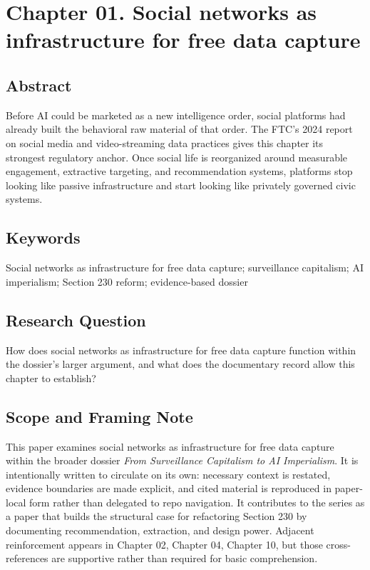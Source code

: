\documentclass[
  american,
  11pt,
  letterpaper,
]{article}
\begin{document}
\newpage

\section{Chapter 01. Social networks as infrastructure for free data
capture}\label{chapter-01.-social-networks-as-infrastructure-for-free-data-capture}

\subsection{Abstract}\label{abstract-1}

Before AI could be marketed as a new intelligence order, social
platforms had already built the behavioral raw material of that order.
The FTC's 2024 report on social media and video-streaming data practices
gives this chapter its strongest regulatory anchor. Once social life is
reorganized around measurable engagement, extractive targeting, and
recommendation systems, platforms stop looking like passive
infrastructure and start looking like privately governed civic systems.

\subsection{Keywords}\label{keywords-1}

Social networks as infrastructure for free data capture; surveillance
capitalism; AI imperialism; Section 230 reform; evidence-based dossier

\subsection{Research Question}\label{research-question-1}

How does social networks as infrastructure for free data capture
function within the dossier's larger argument, and what does the
documentary record allow this chapter to establish?

\subsection{Scope and Framing Note}\label{scope-and-framing-note-1}

This paper examines social networks as infrastructure for free data
capture within the broader dossier \emph{From Surveillance Capitalism to
AI Imperialism}. It is intentionally written to circulate on its own:
necessary context is restated, evidence boundaries are made explicit,
and cited material is reproduced in paper-local form rather than
delegated to repo navigation. It contributes to the series as a paper
that builds the structural case for refactoring Section 230 by
documenting recommendation, extraction, and design power. Adjacent
reinforcement appears in Chapter 02, Chapter 04, Chapter 10, but those
cross-references are supportive rather than required for basic
comprehension.
\end{document}
